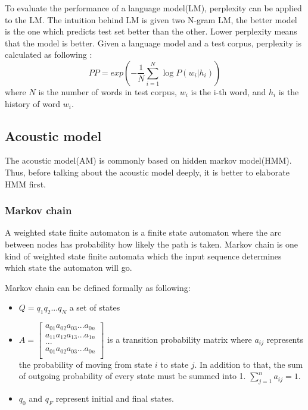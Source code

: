 To evaluate the performance of a language model(LM), perplexity can be applied to the LM. The intuition behind LM is given two N-gram LM, the better model is the one which predicts test set better than the other. Lower perplexity means that the model is better. Given a language model and a test corpus, perplexity is calculated as following \cite{Bahl:1983:MLA:2053027.2053281} \cite{Klakow:2002:TCW:638078.638080}:
\begin{equation}
PP = exp(-\frac{1}{N} \sum^{N}_{i=1} \log P(w_{i}|h_{i}))
\end{equation}
where $N$ is the number of words in test corpus, $w_{i}$ is the i-th word, and $h_{i}$ is the history of word $w_{i}$.


\subsection{Acoustic model}
The acoustic model(AM) is commonly based on hidden markov model(HMM). Thus, before talking about the acoustic model deeply, it is better to elaborate HMM first. 


\subsubsection{Markov chain}
A weighted state finite automaton is a finite state automaton where the arc between nodes has probability how likely the path is taken. Markov chain is one kind of weighted state finite automata which the input sequence determines which state the automaton will go.

Markov chain can be defined formally as following:
\begin{itemize}
\item $Q=q_{1}q_{2}...q_{N}$ a set of states
\item  $A=
\begin{bmatrix}
a_{01}a_{02}a_{03}...a_{0n} \\
a_{11}a_{12}a_{13}...a_{1n} \\
... \\
a_{01}a_{02}a_{03}...a_{0n} \\
\end{bmatrix}
$ is a transition probability matrix where $a_{ij}$ represents the probability of moving from state $i$ to state $j$. In addition to that, the sum of outgoing probability of every state must be summed into 1. $\sum_{j=1}^{n}  a_{ij}=1$. 
\item $q_{0}$ and $q_{F}$ represent initial and final states.
\end{itemize}

